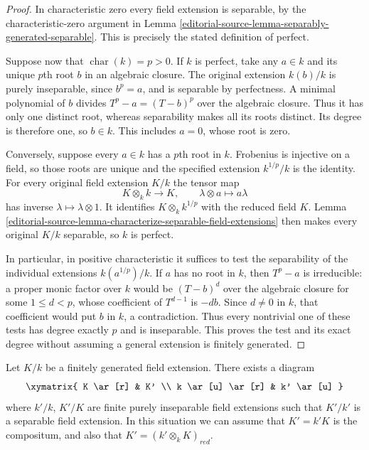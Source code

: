 \begin{proof}
In characteristic zero every field extension is
separable, by the characteristic-zero argument in
Lemma \ref{editorial-source-lemma-separably-generated-separable}.
This is precisely the stated definition of perfect.

Suppose now that $\operatorname{char}(k)=p>0$.
If $k$ is perfect, take any $a\in k$ and its unique
$p$th root $b$ in an algebraic closure. The original
extension $k(b)/k$ is purely inseparable, since
$b^p=a$, and is separable by perfectness. A minimal
polynomial of $b$ divides $T^p-a=(T-b)^p$ over the
algebraic closure. Thus it has only one distinct
root, whereas separability makes all its roots
distinct. Its degree is therefore one, so $b\in k$.
This includes $a=0$, whose root is zero.

Conversely, suppose every $a\in k$ has a $p$th root
in $k$. Frobenius is injective on a field, so those
roots are unique and the specified extension
$k^{1/p}/k$ is the identity. For every original
field extension $K/k$ the tensor map
$$
K\otimes_k k\longrightarrow K,\qquad
\lambda\otimes a\longmapsto a\lambda
$$
has inverse $\lambda\mapsto\lambda\otimes1$.
It identifies $K\otimes_k k^{1/p}$ with the reduced
field $K$. Lemma
\ref{editorial-source-lemma-characterize-separable-field-extensions}
then makes every original $K/k$ separable, so $k$
is perfect.

In particular, in positive characteristic it
suffices to test the separability of the individual
extensions $k(a^{1/p})/k$. If $a$ has no root in $k$,
then $T^p-a$ is irreducible: a proper monic factor
over $k$ would be $(T-b)^d$ over the algebraic
closure for some $1\leq d<p$, whose coefficient
of $T^{d-1}$ is $-db$. Since $d\neq0$ in $k$,
that coefficient would put $b$ in $k$, a contradiction.
Thus every nontrivial one of these tests has degree
exactly $p$ and is inseparable. This proves the
test and its exact degree without assuming a
general extension is finitely generated.
\end{proof}

\begin{lemma}
\label{editorial-source-lemma-make-separable}
Let $K/k$ be a finitely generated field extension.
There exists a diagram
$$
\xymatrix{
K \ar[r] & K' \\
k \ar[u] \ar[r] & k' \ar[u]
}
$$
where $k'/k$, $K'/K$ are finite purely inseparable field
extensions such that $K'/k'$ is a separable field extension.
In this situation we can assume that $K' = k'K$ is the compositum,
and also that $K' = (k' \otimes_k K)_{red}$.
\end{lemma}

